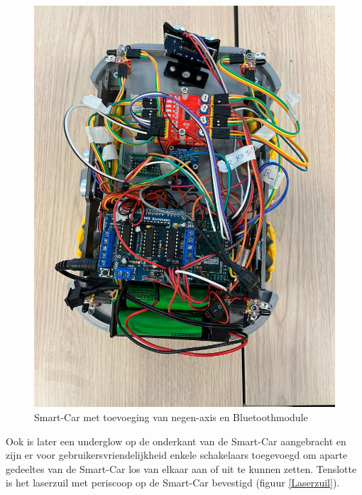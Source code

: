 \begin{figure}[h]
    \centering
    \includegraphics[scale = 0.12]{Media/Figuren/Assemblage/smartcar met toevoegingen.jpg}
    \caption{Smart-Car met toevoeging van negen-axis en Bluetoothmodule}
    \label{Smart-Car met toevoegingen}
\end{figure}

Ook is later een underglow op de onderkant van de \gls{Smart-Car} aangebracht en zijn er voor gebruikersvriendelijkheid enkele schakelaars toegevoegd om aparte gedeeltes van de \gls{Smart-Car} los van elkaar aan of uit te kunnen zetten. Tenslotte is het laserzuil met periscoop op de \gls{Smart-Car} bevestigd (figuur \ref{Laserzuil}).


